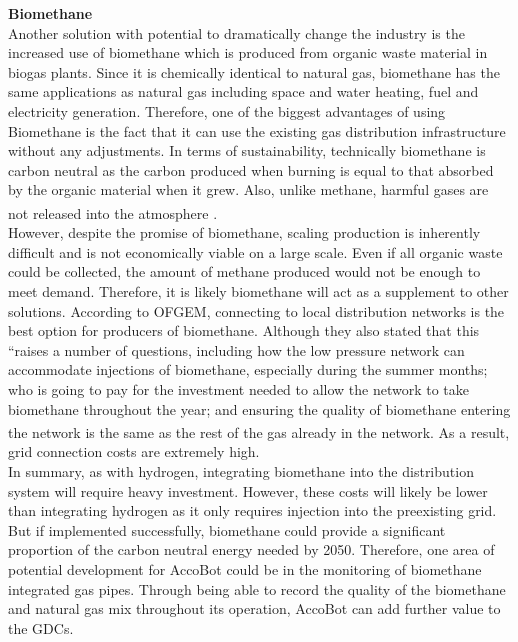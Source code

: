 \documentclass[11pt]{article}		%
\newcommand{\supercite}[1]{\textsuperscript{\cite{#1}}}		%
\begin{document}
            \textbf{Biomethane} 
            \\
            Another solution with potential to dramatically change the industry is the increased use of biomethane which is produced from organic waste material in biogas plants. Since it is chemically identical to natural gas, biomethane has the same applications as natural gas including space and water heating, fuel and electricity generation. Therefore, one of the biggest advantages of using Biomethane is the fact that it can use the existing gas distribution infrastructure without any adjustments. In terms of sustainability, technically biomethane is carbon neutral as the carbon produced when burning is equal to that absorbed by the organic material when it grew. Also, unlike methane, harmful gases are not released into the atmosphere \supercite{biomethanead}.
            \\
    	    \hspace*{3ex}However, despite the promise of biomethane, scaling production is inherently difficult and is not economically viable on a large scale. Even if all organic waste could be collected, the amount of methane produced would not be enough to meet demand. Therefore, it is likely biomethane will act as a supplement to other solutions. According to OFGEM, connecting to local distribution networks is the best option for producers of biomethane. Although they also stated that this “raises a number of questions, including how the low pressure network can accommodate injections of biomethane, especially during the summer months; who is going to pay for the investment needed to allow the network to take biomethane throughout the year; and ensuring the quality of biomethane entering the network is the same as the rest of the gas already in the network\supercite{biomethaneof}. As a result, grid connection costs are extremely high.
    	    \\
        	\hspace*{3ex}In summary, as with hydrogen, integrating biomethane into the distribution system will require heavy investment. However, these costs will likely be lower than integrating hydrogen as it only requires injection into the preexisting grid. But if implemented successfully, biomethane could provide a significant proportion of the carbon neutral energy needed by 2050. Therefore, one area of potential development for AccoBot could be in the monitoring of biomethane integrated gas pipes. Through being able to record the quality of the biomethane and natural gas mix throughout its operation, AccoBot can add further value to the GDCs. 
    
\end{document}
